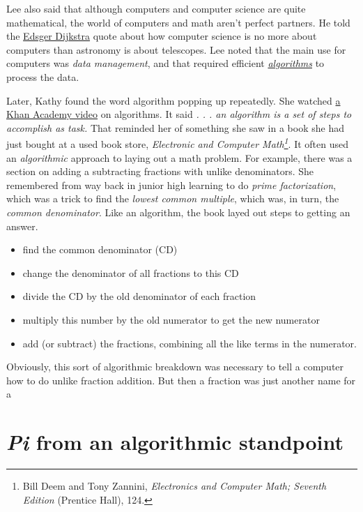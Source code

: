 \documentclass[koma]{article}
\begin{document}
Lee also said that although computers and computer science are quite mathematical, the world of computers and math aren't perfect partners. He told the \href{https://en.wikipedia.org/wiki/Edsger_W._Dijkstra}{Edsger Dijkstra} quote about how computer science is no more about computers than astronomy is about telescopes. Lee noted that the main use for computers was \emph{data management}, and that required efficient \emph{\href{https://en.wikipedia.org/wiki/Algorithm}{algorithms}} to process the data.

Later, Kathy found the word algorithm popping up repeatedly. She watched \href{https://www.khanacademy.org/computing/computer-science/algorithms/intro-to-algorithms/v/what-are-algorithms}{a Khan Academy video}
on algorithms. It said \emph{. . . an algorithm is a set of steps to accomplish as task.} That reminded her of something she saw in a book she had just bought at a used book store, \emph{Electronic and Computer Math\footnote{Bill Deem and  Tony Zannini, \emph{Electronics and Computer Math; Seventh Edition} (Prentice Hall), 124.}}. It often used an \emph{algorithmic} approach to laying out a math problem. For example, there was a section on adding a subtracting fractions with unlike denominators. She remembered from way back in junior high learning to do \emph{prime factorization}, which was a trick to find the \emph{lowest common multiple}, which was, in turn, the \emph{common denominator}. Like an algorithm, the book layed out steps to getting an answer.

\begin{itemize}
\item find the common denominator (CD)
\item change the denominator of all fractions to this CD
\item divide the CD by the old denominator of each fraction
\item multiply this number by the old numerator to get the new numerator
\item add (or subtract) the fractions, combining all the like terms in the numerator.
\end{itemize}

Obviously, this sort of algorithmic breakdown was necessary to tell a computer how to do unlike fraction addition. But then a fraction was just another name for a 


\section{\emph{Pi} from an algorithmic standpoint}
\label{sec:orgheadline6}
\end{document}
